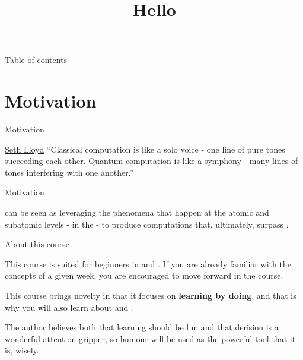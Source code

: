 \documentclass[aspectratio=43]{beamer}
\title{Hello \qw}
\begin{document}
\begin{frame}
	\titlepage
\end{frame}


\begin{frame}{Table of contents}
	\begin{card}
		\tableofcontents
	\end{card}
\end{frame}

\section{Motivation}
\begin{frame}{Motivation}
\begin{card}[Why]
    \begin{chapquote}[2pt]{\href{https://en.wikipedia.org/wiki/Seth_Lloyd}{Seth Lloyd}}
        ``Classical computation is like a solo voice - one line of pure tones succeeding each other. Quantum computation is like a symphony - many lines of tones interfering with one another.''
    \end{chapquote}
\end{card}

\pagenumber
\end{frame}

\begin{frame}{Motivation}
\begin{card}[How]
    \qc can be seen as leveraging the phenomena that happen at the atomic and subatomic levels - in the \qw\xspace- to produce computations that, ultimately, surpass \cc.
\end{card}
\pagenumber
\end{frame}

\begin{frame}{About this course}
\begin{card}
    This course is suited for beginners in \qm and \qc. If you are already familiar with the concepts of a given week, you are encouraged to move forward in the course. 
    
    This course brings novelty in that it focuses on \textbf{learning by doing}, and that is why you will also learn about \qk and \ibmqe.
    
    The author believes both that learning should be fun and that derision is a wonderful attention gripper, so humour will be used as the powerful tool that it is, wisely.
\end{card}
\pagenumber
\end{frame}
\end{document}
